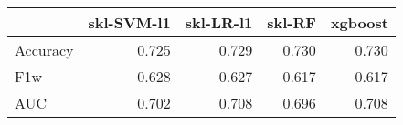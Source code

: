 \begin{tabular}{lrrrr}
\toprule
{} &  skl-SVM-l1 &  skl-LR-l1 &  skl-RF &  xgboost \\
\midrule
Accuracy &       0.725 &      0.729 &   0.730 &    0.730 \\
F1w      &       0.628 &      0.627 &   0.617 &    0.617 \\
AUC      &       0.702 &      0.708 &   0.696 &    0.708 \\
\bottomrule
\end{tabular}
